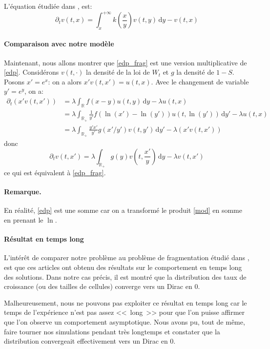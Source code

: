 \documentclass[12pt]{article}
\newcommand{\req}[1]{\paragraph{Remarque.}#1\vspace{0.1cm}}
\newcommand{\pth}[1]{\left(#1\right)}
\newcommand{\de}{\,\mathrm{d}}
\newcommand{\Er}{\mathbb{R}}
\newcommand{\dr}{\partial}
\begin{document}
L'équation étudiée dans \cite{md1}, \cite{md2} est:
\begin{equation}\label{edp_frag}
\dr_tv(t,x)=\int_x^{+\infty}k\pth{\frac{x}{y}}v(t,y)\de y-v(t,x)
\end{equation}


\paragraph{Comparaison avec notre modèle}

Maintenant, nous allons montrer que \eqref{edp_frag} est une version multiplicative de \eqref{edp}.  Considérons $v(t,\cdot)$ la densité de la loi de $W_t$ et $g$ la densité de $1-S$. Posons $x'=e^x$: on a alors $x'v(t,x')=u(t,x)$. Avec le changement de variable $y'=e^y$, on a:
\begin{align*}
  \dr_t(x'v(t,x'))
  &=\lambda\int_{\Er}f(x-y)u(t,y)\de y-\lambda u(t,x)\\
  &=\lambda\int_{\Er_+}\frac{1}{y'}f(\ln(x')-\ln(y'))u(t,\ln(y'))\de y'-\lambda u(t,x)\\
  &=\lambda\int_{\Er_+}\frac{y'x'}{y'}g(x'/y')v\pth{t,y'}\de y'-\lambda\pth{x'v(t,x')}
\end{align*}
donc 
\[\dr_tv(t,x')=\lambda\int_{\Er_+}g(y)v\pth{t,\frac{x'}{y}}\de y-\lambda v(t,x')\]
ce qui est équivalent à \eqref{edp_frag}.

\req{En réalité, \eqref{edp} est une somme car on a transformé le produit \eqref{mod} en somme en prenant le $\ln$.}


\paragraph{Résultat en temps long} L'intérêt de comparer notre problème au problème de fragmentation étudié dans \cite{md1}, \cite{md2} est que ces articles ont obtenu des résultats sur le comportement en temps long des solutions. Dans notre cas précis, il est montré que la distribution des taux de croissance (ou des tailles de cellules) converge vers un Dirac en 0. 

Malheureusement, nous ne pouvons pas exploiter ce résultat en temps long car le temps de l'expérience n'est pas assez <<~long~>> pour que l'on puisse affirmer que l'on observe un comportement asymptotique. Nous avons pu, tout de même, faire tourner nos simulations pendant très longtemps et constater que la distribution convergeait effectivement vers un Dirac en 0.
\end{document}
